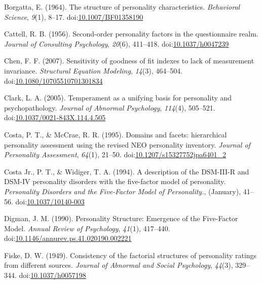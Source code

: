 \documentclass[,man,floatsintext]{apa6}
\theoremstyle{definition}
\theoremstyle{definition}
\theoremstyle{definition}
\theoremstyle{remark}
\begin{document}
\leavevmode\hypertarget{ref-Borgatta1964}{}%
Borgatta, E. (1964). The structure of personality characteristics.
\emph{Behavioral Science}, \emph{9}(1), 8--17.
doi:\href{https://doi.org/10.1007/BF01358190}{10.1007/BF01358190}

\leavevmode\hypertarget{ref-Cattell1956}{}%
Cattell, R. B. (1956). Second-order personality factors in the
questionnaire realm. \emph{Journal of Consulting Psychology},
\emph{20}(6), 411--418.
doi:\href{https://doi.org/10.1037/h0047239}{10.1037/h0047239}

\leavevmode\hypertarget{ref-Chen2007}{}%
Chen, F. F. (2007). Sensitivity of goodness of fit indexes to lack of
measurement invariance. \emph{Structural Equation Modeling},
\emph{14}(3), 464--504.
doi:\href{https://doi.org/10.1080/10705510701301834}{10.1080/10705510701301834}

\leavevmode\hypertarget{ref-Clark2005}{}%
Clark, L. A. (2005). Temperament as a unifying basis for personality and
psychopathology. \emph{Journal of Abnormal Psychology}, \emph{114}(4),
505--521.
doi:\href{https://doi.org/10.1037/0021-843X.114.4.505}{10.1037/0021-843X.114.4.505}

\leavevmode\hypertarget{ref-Costa1995}{}%
Costa, P. T., \& McCrae, R. R. (1995). Domains and facets: hierarchical
personality assessment using the revised NEO personality inventory.
\emph{Journal of Personality Assessment}, \emph{64}(1), 21--50.
doi:\href{https://doi.org/10.1207/s15327752jpa6401_2}{10.1207/s15327752jpa6401\_2}

\leavevmode\hypertarget{ref-Widiger1994}{}%
Costa Jr., P. T., \& Widiger, T. A. (1994). A description of the
DSM-III-R and DSM-IV personality disorders with the five-factor model of
personality. \emph{Personality Disorders and the Five-Factor Model of
Personality.}, (January), 41--56.
doi:\href{https://doi.org/10.1037/10140-003}{10.1037/10140-003}

\leavevmode\hypertarget{ref-Digman1990}{}%
Digman, J. M. (1990). Personality Structure: Emergence of the
Five-Factor Model. \emph{Annual Review of Psychology}, \emph{41}(1),
417--440.
doi:\href{https://doi.org/10.1146/annurev.ps.41.020190.002221}{10.1146/annurev.ps.41.020190.002221}

\leavevmode\hypertarget{ref-Fiske1949}{}%
Fiske, D. W. (1949). Consistency of the factorial structures of
personality ratings from different sources. \emph{Journal of Abnormal
and Social Psychology}, \emph{44}(3), 329--344.
doi:\href{https://doi.org/10.1037/h0057198}{10.1037/h0057198}
\end{document}
